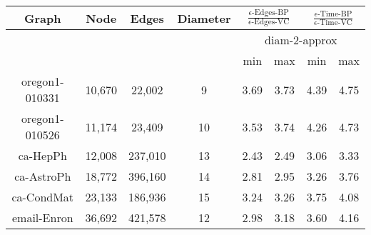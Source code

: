 \begin{table*}[ht]
\centering %
\begin{tabular}{|c c c c |c c |c  c |} %
\hline\hline %
Graph & Node & Edges & Diameter  & \multicolumn{2}{|c|}{$\frac{\epsilon\mbox{-Edges-BP}}{ \epsilon\mbox{-Edges-VC}}$} & \multicolumn{2}{c|}{$\frac{\epsilon\mbox{-Time-BP}}{\epsilon\mbox{-Time-VC}}$}\\ [0.5ex] %
\hline
&  &  & &\multicolumn{4}{|c|}{diam-2-approx} \\
\hline
&  &  & & min & max & min & max\\
\hline %
oregon1-010331 & 10,670 & 22,002 & 9 & 3.69 & 3.73 & 4.39 & 4.75\\  %
oregon1-010526 & 11,174 & 23,409 & 10 &  3.53 & 3.74 & 4.26 & 4.73 \\
ca-HepPh & 12,008 & 237,010 & 13  & 2.43 & 2.49 & 3.06 & 3.33\\
ca-AstroPh & 18,772 & 396,160  & 14  & 2.81 & 2.95 & 3.26 & 3.76\\
ca-CondMat & 23,133 & 186,936 & 15  & 3.24 & 3.26 & 3.75 & 4.08\\
email-Enron & 36,692 & 421,578 & 12  & 2.98 & 3.18 & 3.60 & 4.16\\[1ex] %
\hline %
\end{tabular}
\caption{
}
\label{table:expUndir} %
\end{table*}


